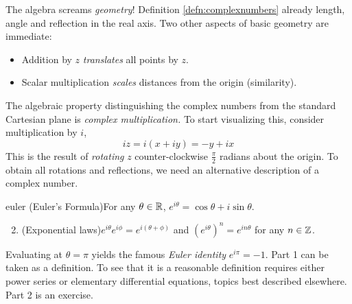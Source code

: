 The algebra screams \emph{geometry}! Definition \ref{defn:complexnumbers} already length, angle and reflection in the real axis. Two other aspects of basic geometry are immediate:
\begin{itemize}%
  \item Addition by $z$ \emph{translates} all points by $z$.
  \item Scalar multiplication \emph{scales} distances from the origin (similarity).
\end{itemize}
The algebraic property distinguishing the complex numbers from the standard Cartesian plane is \emph{complex multiplication.} To start visualizing this, consider multiplication by $i$,
\[iz=i(x+iy)=-y+ix\]
This is the result of \emph{rotating} $z$ counter-clockwise $\frac\pi 2$ radians about the origin. To obtain all rotations and reflections, we need an alternative description of a complex number.

\begin{lemm}{}{euler}
\exstart (Euler's Formula)\lstsp For any $\theta\in\mathbb{R}$, $e^{i\theta}=\cos\theta+i\sin\theta$. 
\begin{enumerate}\setcounter{enumi}{1}
  \item (Exponential laws)\lstsp$e^{i\theta}e^{i\phi}=e^{i(\theta+\phi)}$ and $(e^{i\theta})^n=e^{in\theta}$ for any $n\in\mathbb{Z}$.
\end{enumerate}
\end{lemm}

Evaluating at $\theta=\pi$ yields the famous \emph{Euler identity} $e^{i\pi}=-1$. Part 1 can be taken as a definition. To see that it is a reasonable definition requires either power series or elementary differential equations, topics best described elsewhere. Part 2 is an exercise.

\goodbreak

% 

